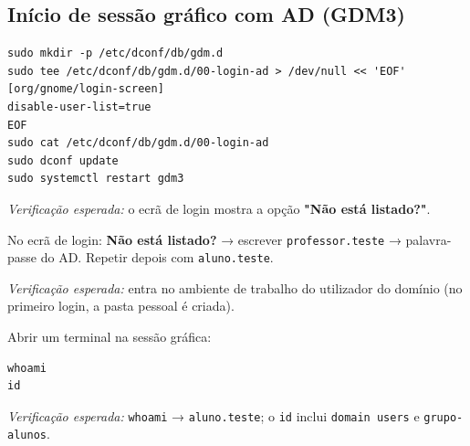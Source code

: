 
\subsection[Início de sessão gráfico com AD (GDM3)]{Início de sessão gráfico com AD (GDM3)}


\begin{lstlisting}[style=bashstyle]
sudo mkdir -p /etc/dconf/db/gdm.d
sudo tee /etc/dconf/db/gdm.d/00-login-ad > /dev/null << 'EOF'
[org/gnome/login-screen]
disable-user-list=true
EOF
sudo cat /etc/dconf/db/gdm.d/00-login-ad
sudo dconf update
sudo systemctl restart gdm3
\end{lstlisting}

\emph{Verificação esperada:} o ecrã de login mostra a opção \textbf{"Não está listado?"}.


No ecrã de login: \textbf{Não está listado?} → escrever \texttt{professor.teste} → palavra-passe do AD. Repetir depois com \texttt{aluno.teste}.

\emph{Verificação esperada:} entra no ambiente de trabalho do utilizador do domínio (no primeiro login, a pasta pessoal é criada).


Abrir um terminal na sessão gráfica:

\begin{lstlisting}[style=bashstyle]
whoami
id
\end{lstlisting}

\emph{Verificação esperada:} \texttt{whoami} → \texttt{aluno.teste}; o \texttt{id} inclui \texttt{domain users} e \texttt{grupo-alunos}.

